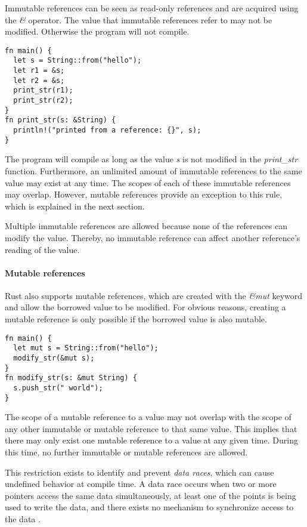 \documentclass[sigplan,11pt,nonacm]{acmart}
\begin{document}
Immutable references can be seen as read-only references and are acquired using the \emph{\&} operator.
The value that immutable references refer to may not be modified.
Otherwise the program will not compile.

\begin{lstlisting}
fn main() {
  let s = String::from("hello");
  let r1 = &s;
  let r2 = &s;
  print_str(r1);
  print_str(r2);
}
fn print_str(s: &String) {
  println!("printed from a reference: {}", s);
}
\end{lstlisting}

The program will compile as long as the value \emph{s} is not modified in the \emph{print\_str} function.
Furthermore, an unlimited amount of immutable references to the same value may exist at any time.
The scopes of each of these immutable references may overlap.
However, mutable references provide an exception to this rule, which is explained in the next section.

Multiple immutable references are allowed because none of the references can modify the value.
Thereby, no immutable reference can affect another reference's reading of the value.


\paragraph{Mutable references}

Rust also supports mutable references, which are created with the \emph{\&mut} keyword and allow the borrowed value to be modified.
For obvious reasons, creating a mutable reference is only possible if the borrowed value is also mutable.

\begin{lstlisting}
fn main() {
  let mut s = String::from("hello");
  modify_str(&mut s);
}
fn modify_str(s: &mut String) {
  s.push_str(" world");
}
\end{lstlisting}

The scope of a mutable reference to a value may not overlap with the scope of any other immutable or mutable reference to that same value.
This implies that there may only exist one mutable reference to a value at any given time.
During this time, no further immutable or mutable references are allowed.

This restriction exists to identify and prevent \emph{data races}, which can cause undefined behavior at compile time.
A data race occurs when two or more pointers access the same data simultaneously, at least one of the points is being used to write the data, and there exists no mechanism to synchronize access to the data \cite{rust-book}.
\end{document}
